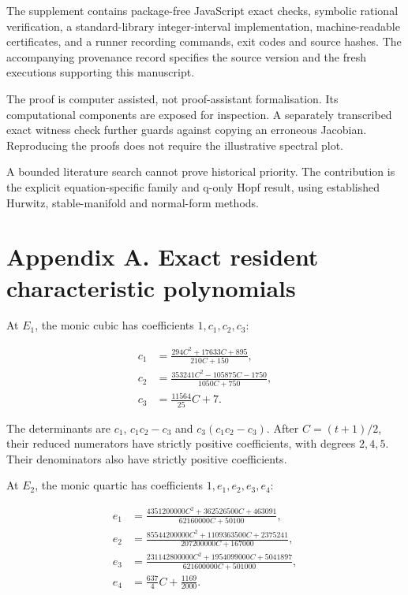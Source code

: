 \documentclass[
  11pt,
]{article}
\begin{document}
The supplement contains package-free JavaScript exact checks, symbolic
rational verification, a standard-library integer-interval
implementation, machine-readable certificates, and a runner recording
commands, exit codes and source hashes. The accompanying provenance
record specifies the source version and the fresh executions supporting
this manuscript.

The proof is computer assisted, not proof-assistant formalisation. Its
computational components are exposed for inspection. A separately
transcribed exact witness check further guards against copying an
erroneous Jacobian. Reproducing the proofs does not require the
illustrative spectral plot.

A bounded literature search cannot prove historical priority. The
contribution is the explicit equation-specific family and q-only Hopf
result, using established Hurwitz, stable-manifold and normal-form
methods.

\section{Appendix A. Exact resident characteristic
polynomials}\label{appendix-a.-exact-resident-characteristic-polynomials}

At \(E_1\), the monic cubic has coefficients \(1,c_1,c_2,c_3\):

\[
\begin{aligned}
c_1&=\frac{294C^2+17633C+895}{210C+150},\\
c_2&=\frac{353241C^2-105875C-1750}{1050C+750},\\
c_3&=\frac{11564}{25}C+7.
\end{aligned}
\]

The determinants are \(c_1\), \(c_1c_2-c_3\) and \(c_3(c_1c_2-c_3)\).
After \(C=(t+1)/2\), their reduced numerators have strictly positive
coefficients, with degrees \(2,4,5\). Their denominators also have
strictly positive coefficients.

At \(E_2\), the monic quartic has coefficients \(1,e_1,e_2,e_3,e_4\):

\[
\begin{aligned}
e_1&=\frac{4351200000C^2+362526500C+463091}{62160000C+50100},\\
e_2&=\frac{85544200000C^2+1109363500C+2375241}{207200000C+167000},\\
e_3&=\frac{231142800000C^2+1954099000C+5041897}{621600000C+501000},\\
e_4&=\frac{637}{4}C+\frac{1169}{2000}.
\end{aligned}
\]
\end{document}
